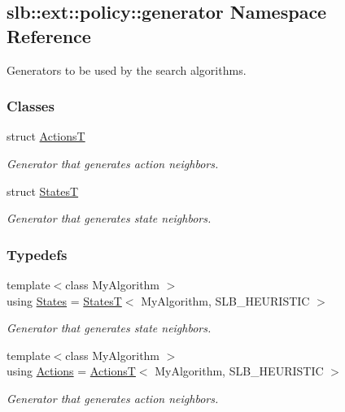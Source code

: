 \hypertarget{namespaceslb_1_1ext_1_1policy_1_1generator}{}\subsection{slb\+:\+:ext\+:\+:policy\+:\+:generator Namespace Reference}
\label{namespaceslb_1_1ext_1_1policy_1_1generator}


Generators to be used by the search algorithms.  


\subsubsection*{Classes}
\begin{DoxyCompactItemize}
\item 
struct \hyperlink{structslb_1_1ext_1_1policy_1_1generator_1_1ActionsT}{ActionsT}
\begin{DoxyCompactList}\small\item\em Generator that generates action neighbors. \end{DoxyCompactList}\item 
struct \hyperlink{structslb_1_1ext_1_1policy_1_1generator_1_1StatesT}{StatesT}
\begin{DoxyCompactList}\small\item\em Generator that generates state neighbors. \end{DoxyCompactList}\end{DoxyCompactItemize}
\subsubsection*{Typedefs}
\begin{DoxyCompactItemize}
\item 
{\footnotesize template$<$class My\+Algorithm $>$ }\\using \hyperlink{namespaceslb_1_1ext_1_1policy_1_1generator_a712500d6a77d98fdbc9baace652dc5ee}{States} = \hyperlink{structslb_1_1ext_1_1policy_1_1generator_1_1StatesT}{StatesT}$<$ My\+Algorithm, S\+L\+B\+\_\+\+H\+E\+U\+R\+I\+S\+T\+IC $>$
\begin{DoxyCompactList}\small\item\em Generator that generates state neighbors. \end{DoxyCompactList}\item 
{\footnotesize template$<$class My\+Algorithm $>$ }\\using \hyperlink{namespaceslb_1_1ext_1_1policy_1_1generator_aa810b71d654db732e5433be0f4baf4fa}{Actions} = \hyperlink{structslb_1_1ext_1_1policy_1_1generator_1_1ActionsT}{ActionsT}$<$ My\+Algorithm, S\+L\+B\+\_\+\+H\+E\+U\+R\+I\+S\+T\+IC $>$
\begin{DoxyCompactList}\small\item\em Generator that generates action neighbors. \end{DoxyCompactList}\end{DoxyCompactItemize}


